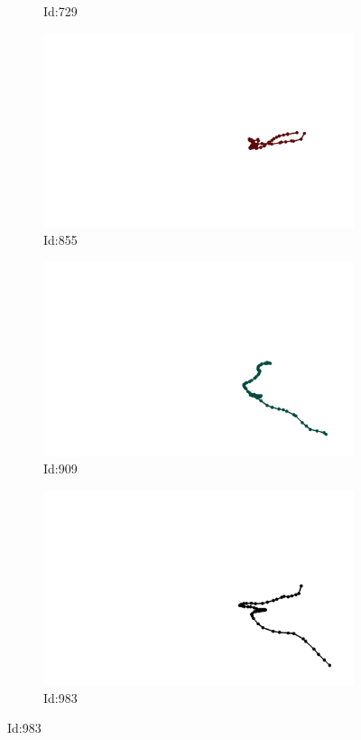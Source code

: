 \documentclass[12pt,twoside]{report}
\begin{document}
\begin{figure}
\begin{subfigure}[b]{0.20\textwidth}
\caption{Id:729}
\end{subfigure}
\begin{subfigure}[b]{0.20\textwidth}
\centering
\includegraphics[width=\textwidth]{../../trajectories/855.png}
\caption{Id:855}
\end{subfigure}
\begin{subfigure}[b]{0.20\textwidth}
\centering
\includegraphics[width=\textwidth]{../../trajectories/909.png}
\caption{Id:909}
\end{subfigure}
\begin{subfigure}[b]{0.20\textwidth}
\centering
\includegraphics[width=\textwidth]{../../trajectories/983.png}
\caption{Id:983}
\end{subfigure}
\end{figure}
\end{document}
